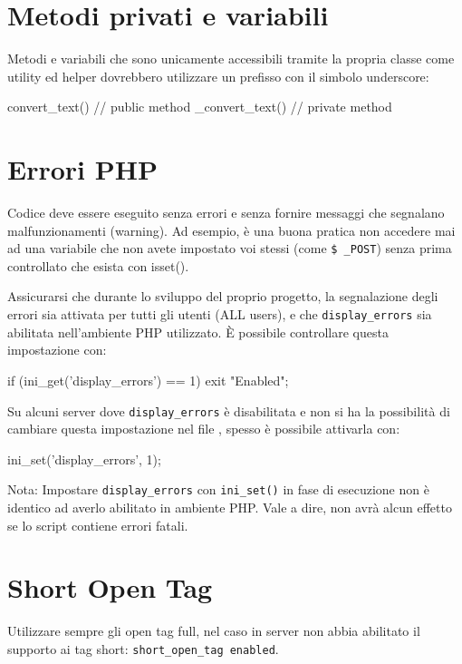 
\section{Metodi privati e variabili}
Metodi e variabili che sono unicamente accessibili tramite la propria classe come utility ed helper dovrebbero utilizzare un prefisso con il simbolo underscore:

\begin{code}
convert_text() // public method
_convert_text()	// private method
\end{code}

\section{Errori PHP}
Codice deve essere eseguito senza errori e senza fornire messaggi che segnalano malfunzionamenti (warning). Ad esempio, è una buona pratica non accedere mai ad una variabile che non avete impostato voi stessi (come \verb|$ _POST|) senza prima controllato che esista con isset().

Assicurarsi che durante lo sviluppo del proprio progetto, la segnalazione degli errori sia attivata per tutti gli utenti (ALL users), e che \verb|display_errors| sia abilitata nell'ambiente \ac{PHP} utilizzato. È possibile controllare questa impostazione con:

\begin{code}
if (ini_get('display_errors') == 1)
{
	exit "Enabled";
}
\end{code}

Su alcuni server dove \verb|display_errors| è disabilitata e non si ha la possibilità di cambiare questa impostazione nel file , spesso è possibile attivarla con:

\begin{code}
ini_set('display_errors', 1);
\end{code}

Nota: Impostare  \verb|display_errors| con \verb|ini_set()| in fase di esecuzione non è identico ad averlo abilitato in ambiente PHP. Vale a dire, non avrà alcun effetto se lo script contiene errori fatali.

\section{Short Open Tag}
Utilizzare sempre gli open tag full, nel caso in server non abbia abilitato il supporto ai tag short: \verb|short_open_tag enabled|.

